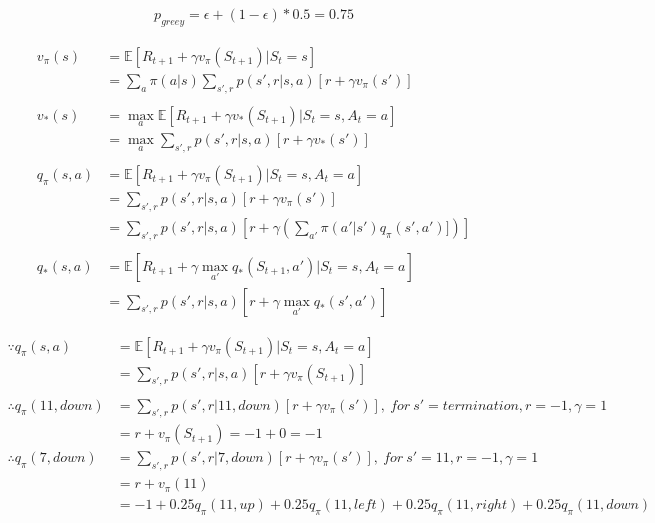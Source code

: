 \documentclass{article}
\begin{document}
\[
  \begin{aligned}
  p_{greey} = \epsilon + (1 - \epsilon) * 0.5 = 0.75
  \end{aligned}
\]

\[
  \begin{aligned}
  v_{\pi}(s) &= \mathbb{E}[R_{t+1} + \gamma v_{\pi}(S_{t+1}) | S_{t}=s] \\
  &= \sum_{a}\pi(a|s) \sum_{s',r}p(s',r|s,a)[r + \gamma v_{\pi}(s')]\\
  \\
  v_{*}(s) &= \max_{a}\mathbb{E}[R_{t+1} + \gamma v_{*}(S_{t+1}) | S_{t}=s, A_{t}=a]\\
  &= \max_{a}\sum_{s',r}p(s',r|s,a)[r + \gamma v_{*}(s')]\\
  \\
  q_{\pi}(s,a) &= \mathbb{E}[R_{t+1} + \gamma v_{\pi}(S_{t+1}) | S_{t}=s, A_{t}=a]\\
  &= \sum_{s',r}p(s',r|s,a)[r + \gamma v_{\pi}(s')]\\
  &= \sum_{s',r}p(s',r|s,a)[r + \gamma (\sum_{a'}\pi(a'|s') q_{\pi}(s',a')])]\\
  \\
  q_{*}(s,a) &= \mathbb{E}[R_{t+1} + \gamma \max_{a'}q_{*}(S_{t+1}, a') | S_{t}=s, A_{t}=a]\\
  &= \sum_{s',r}p(s',r|s,a)[r + \gamma \max_{a'}q_{*}(s', a')]
  \end{aligned}
\]

\[
  \begin{aligned}
    \because q_{\pi}(s,a) &= \mathbb{E}[R_{t+1} + \gamma v_{\pi}(S_{t+1}) | S_{t}=s, A_{t}=a]\\
    &= \sum_{s',r}p(s',r|s,a)[r + \gamma v_{\pi}(S_{t+1})]\\
    \\
    \therefore q_{\pi}(11,down) &= \sum_{s',r}p(s',r|11,down)[r + \gamma v_{\pi}(s')], \  for \  s'=termination, r=-1, \gamma = 1\\
    &= r + v_{\pi}(S_{t+1}) = -1 + 0 = -1 \\
    \therefore q_{\pi}(7,down) &= \sum_{s',r}p(s',r|7,down)[r + \gamma v_{\pi}(s')], \  for \  s'=11, r=-1, \gamma = 1\\
    &= r + v_{\pi}(11) \\
    &= -1 + 0.25q_{\pi}(11,up) + 0.25q_{\pi}(11,left) + 0.25q_{\pi}(11,right) + 0.25q_{\pi}(11,down)\\
  \end{aligned}
\]
\end{document}
